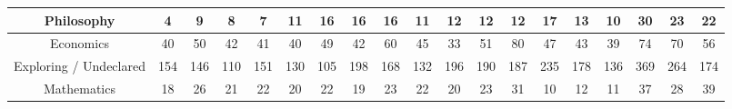 \documentclass[10pt]{article}
\begin{document}
\begin{landscape}
\begin{longtable}[c]{|ccccccccccccccccccc|}
	\multicolumn{1}{|c|}{Philosophy}                                 & \multicolumn{1}{c|}{4}          & \multicolumn{1}{c|}{9}          & \multicolumn{1}{c|}{8}          & \multicolumn{1}{c|}{7}          & \multicolumn{1}{c|}{11}         & \multicolumn{1}{c|}{16}         & \multicolumn{1}{c|}{16}         & \multicolumn{1}{c|}{16}         & \multicolumn{1}{c|}{11}         & \multicolumn{1}{c|}{12}         & \multicolumn{1}{c|}{12}         & \multicolumn{1}{c|}{12}         & \multicolumn{1}{c|}{17}         & \multicolumn{1}{c|}{13}         & \multicolumn{1}{c|}{10}         & \multicolumn{1}{c|}{30}         & \multicolumn{1}{c|}{23}         & 22         \\ \hline
	\multicolumn{1}{|c|}{Economics}                                  & \multicolumn{1}{c|}{40}         & \multicolumn{1}{c|}{50}         & \multicolumn{1}{c|}{42}         & \multicolumn{1}{c|}{41}         & \multicolumn{1}{c|}{40}         & \multicolumn{1}{c|}{49}         & \multicolumn{1}{c|}{42}         & \multicolumn{1}{c|}{60}         & \multicolumn{1}{c|}{45}         & \multicolumn{1}{c|}{33}         & \multicolumn{1}{c|}{51}         & \multicolumn{1}{c|}{80}         & \multicolumn{1}{c|}{47}         & \multicolumn{1}{c|}{43}         & \multicolumn{1}{c|}{39}         & \multicolumn{1}{c|}{74}         & \multicolumn{1}{c|}{70}         & 56         \\ \hline
	\multicolumn{1}{|c|}{Exploring / Undeclared}                     & \multicolumn{1}{c|}{154}        & \multicolumn{1}{c|}{146}        & \multicolumn{1}{c|}{110}        & \multicolumn{1}{c|}{151}        & \multicolumn{1}{c|}{130}        & \multicolumn{1}{c|}{105}        & \multicolumn{1}{c|}{198}        & \multicolumn{1}{c|}{168}        & \multicolumn{1}{c|}{132}        & \multicolumn{1}{c|}{196}        & \multicolumn{1}{c|}{190}        & \multicolumn{1}{c|}{187}        & \multicolumn{1}{c|}{235}        & \multicolumn{1}{c|}{178}        & \multicolumn{1}{c|}{136}        & \multicolumn{1}{c|}{369}        & \multicolumn{1}{c|}{264}        & 174        \\ \hline
	\multicolumn{1}{|c|}{Mathematics}                                & \multicolumn{1}{c|}{18}         & \multicolumn{1}{c|}{26}         & \multicolumn{1}{c|}{21}         & \multicolumn{1}{c|}{22}         & \multicolumn{1}{c|}{20}         & \multicolumn{1}{c|}{22}         & \multicolumn{1}{c|}{19}         & \multicolumn{1}{c|}{23}         & \multicolumn{1}{c|}{22}         & \multicolumn{1}{c|}{20}         & \multicolumn{1}{c|}{23}         & \multicolumn{1}{c|}{31}         & \multicolumn{1}{c|}{10}         & \multicolumn{1}{c|}{12}         & \multicolumn{1}{c|}{11}         & \multicolumn{1}{c|}{37}         & \multicolumn{1}{c|}{28}         & 39         \\ \hline

\end{longtable}
\end{landscape}
\end{document}
